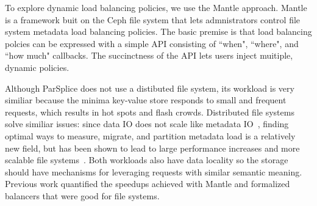 To explore dynamic load balancing policies, we use the Mantle approach.  Mantle
is a framework buit on the Ceph file system that lets admnistrators control
file system metadata load balancing policies. The basic premise is that load
balancing polcies can be expressed with a simple API consisting of ``when",
``where", and ``how much" callbacks. The succinctness of the API lets users
inject muitiple, dynamic policies.  

Although ParSplice does not use a distibuted file system, its workload is very
similiar because the minima key-value store responds to small and frequent
requests, which results in hot spots and flash crowds.  Distributed file
systems solve similiar issues: since data IO does not scale like metadata
IO~\cite{roselli:atec2000-FS-workloads}, finding optimal ways to measure,
migrate, and partition metadata load is a relatively new field, but has been
shown to lead to large performance increases and more scalable file
systems~\cite{zheng:pdsw2014-batchfs, grider:pdsw2015-marfs,
ren:sc2014-indexfs, patil:fast2011-giga+, brandt:msst2003-lh}.  Both workloads
also have data locality so the storage should have mechanisms for leveraging
requests with similar semantic meaning.  Previous work quantified the speedups
achieved with Mantle and formalized balancers that were good for file systems.


